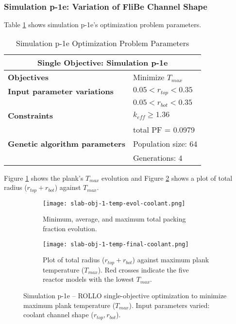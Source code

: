 \subsubsection{Simulation p-1e: Variation of FliBe Channel Shape}
Table \ref{tab:simulationp1e} shows simulation p-1e's optimization problem parameters. 
\begin{table}[htbp]
    \centering
    \onehalfspacing
    \caption{Simulation p-1e Optimization Problem Parameters}
	\label{tab:simulationp1e}
    \footnotesize
    \begin{tabular}{l|p{3cm}}
    \hline 
    \multicolumn{2}{c}{\textbf{Single Objective: Simulation p-1e}} \\
    \hline 
    \textbf{Objectives} & Minimize $T_{max}$ \\
    \hline 
    \textbf{Input parameter variations} & $0.05<r_{top}<0.35$ \\
    & $0.05<r_{bot}<0.35$ \\
    \hline
    \textbf{Constraints} & $k_{eff} \geq 1.36$\\ 
    & total PF = 0.0979\\
    \hline 
    \textbf{Genetic algorithm parameters} & Population size: 64 \\
    & Generations: 4 \\
    \hline
    \end{tabular}
\end{table}
Figure \ref{fig:slab-obj-1-temp-evol-coolant} shows the plank's $T_{max}$ evolution 
and Figure \ref{fig:slab-obj-1-temp-final-coolant} shows a plot of total radius 
($r_{top} + r_{bot}$) against $T_{max}$. 
\begin{figure}[htbp]
    \centering
    \begin{subfigure}{\textwidth}
        \texttt{[image: slab-obj-1-temp-evol-coolant.png]}
        \caption{Minimum, average, and maximum total packing fraction evolution.}
        \label{fig:slab-obj-1-temp-evol-coolant} 
    \end{subfigure}
    \begin{subfigure}{\textwidth}
        \texttt{[image: slab-obj-1-temp-final-coolant.png]}
        \caption{Plot of total radius ($r_{top} + r_{bot}$) against maximum plank 
        temperature ($T_{max}$). Red crosses indicate the five reactor models with the 
        lowest $T_{max}$.}
        \label{fig:slab-obj-1-temp-final-coolant} 
    \end{subfigure}
    \caption{Simulation p-1e -- ROLLO single-objective optimization to minimize 
    maximum plank temperature ($T_{max}$). Input parameters varied: coolant channel shape 
    ($r_{top}, r_{bot}$).}
    \label{fig:slab-obj-1-temp-coolant}
\end{figure}

